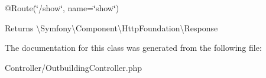 @\+Route(\char`\"{}/show\char`\"{}, name=\char`\"{}show\char`\"{}) \begin{DoxyReturn}{Returns}
\textbackslash{}\+Symfony\textbackslash{}\+Component\textbackslash{}\+Http\+Foundation\textbackslash{}\+Response 
\end{DoxyReturn}


The documentation for this class was generated from the following file\+:\begin{DoxyCompactItemize}
\item 
Controller/Outbuilding\+Controller.\+php\end{DoxyCompactItemize}
